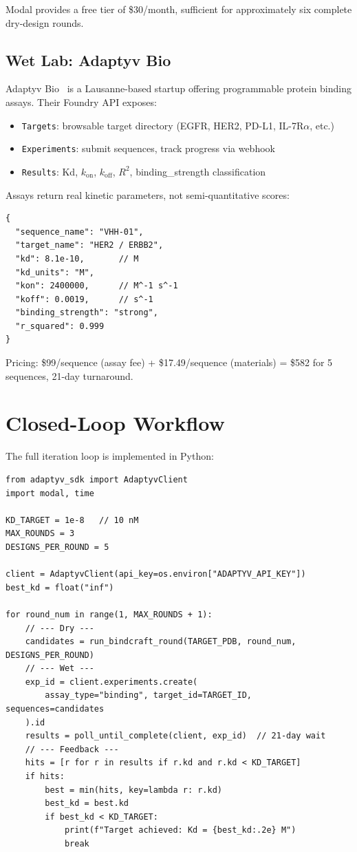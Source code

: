 \documentclass[12pt,a4paper]{article}
\begin{document}
Modal provides a free tier of \$30/month, sufficient for approximately six
complete dry-design rounds.

\subsection{Wet Lab: Adaptyv Bio}

Adaptyv Bio~\citep{adaptyv_bio} is a Lausanne-based startup offering
programmable protein binding assays. Their Foundry API exposes:

\begin{itemize}
  \item \texttt{Targets}: browsable target directory (EGFR, HER2, PD-L1,
    IL-7R$\alpha$, etc.)
  \item \texttt{Experiments}: submit sequences, track progress via webhook
  \item \texttt{Results}: Kd, $k_{\text{on}}$, $k_{\text{off}}$, $R^2$,
    binding\_strength classification
\end{itemize}

Assays return real kinetic parameters, not semi-quantitative scores:

\begin{lstlisting}
{
  "sequence_name": "VHH-01",
  "target_name": "HER2 / ERBB2",
  "kd": 8.1e-10,       // M
  "kd_units": "M",
  "kon": 2400000,      // M^-1 s^-1
  "koff": 0.0019,      // s^-1
  "binding_strength": "strong",
  "r_squared": 0.999
}
\end{lstlisting}

Pricing: \$99/sequence (assay fee) + \$17.49/sequence (materials) =
\$582 for 5 sequences, 21-day turnaround.

\section{Closed-Loop Workflow}\label{sec:workflow}

The full iteration loop is implemented in Python:

\begin{lstlisting}
from adaptyv_sdk import AdaptyvClient
import modal, time

KD_TARGET = 1e-8   // 10 nM
MAX_ROUNDS = 3
DESIGNS_PER_ROUND = 5

client = AdaptyvClient(api_key=os.environ["ADAPTYV_API_KEY"])
best_kd = float("inf")

for round_num in range(1, MAX_ROUNDS + 1):
    // --- Dry ---
    candidates = run_bindcraft_round(TARGET_PDB, round_num, DESIGNS_PER_ROUND)
    // --- Wet ---
    exp_id = client.experiments.create(
        assay_type="binding", target_id=TARGET_ID, sequences=candidates
    ).id
    results = poll_until_complete(client, exp_id)  // 21-day wait
    // --- Feedback ---
    hits = [r for r in results if r.kd and r.kd < KD_TARGET]
    if hits:
        best = min(hits, key=lambda r: r.kd)
        best_kd = best.kd
        if best_kd < KD_TARGET:
            print(f"Target achieved: Kd = {best_kd:.2e} M")
            break
\end{lstlisting}
\end{document}
